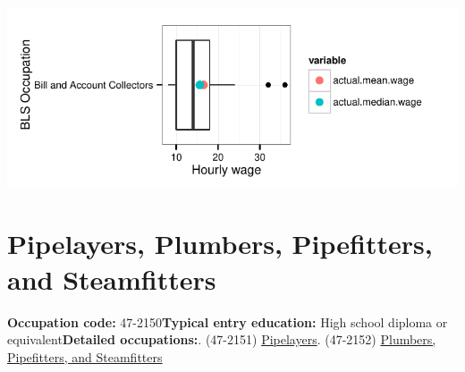 \documentclass[a4paper,10pt]{article}\usepackage[]{graphicx}\usepackage[]{color}
\makeatletter
\def\maxwidth{ %
  \ifdim\Gin@nat@width>\linewidth
    \linewidth
  \else
    \Gin@nat@width
  \fi
}
\makeatother
\begin{document}
{\centering \includegraphics[width=\maxwidth]{figure/unnamed-chunk-287} 

}


\newpage\section{Pipelayers, Plumbers, Pipefitters, and Steamfitters}\textbf{Occupation code:} 47-2150\newline\textbf{Typical entry education:} High school diploma or equivalent\newline\textbf{Detailed occupations:}. (47-2151)  \href{http://www.bls.gov/oes/current/oes472151.htm}{Pipelayers}. (47-2152)  \href{http://www.bls.gov/oes/current/oes472152.htm}{Plumbers, Pipefitters, and Steamfitters}\newline%
\end{document}
